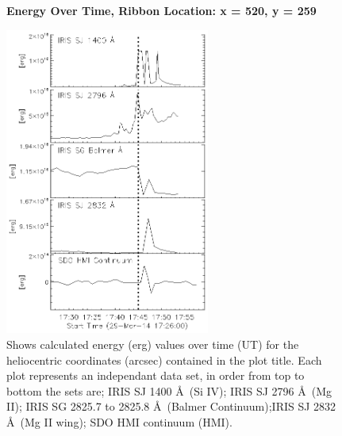 \begin{figure}[H]
  \begin{center}
  \textbf{Energy Over Time, Ribbon Location: x = 520, y = 259 }\par\medskip
  \includegraphics[width=0.6\textwidth]{29-Mar-14-Ribbon-xyPosition-520-259-Frame-2-Energy-Ladder}
  \end{center}
  \caption{Shows calculated energy (erg) values over time (UT) for the heliocentric coordinates (arcsec) contained in the plot title. Each plot represents an independant data set, in order from top to bottom the sets are; IRIS SJ 1400 \AA\ (Si IV); IRIS SJ 2796 \AA\ (Mg II); IRIS SG  2825.7 to 2825.8 \AA\ (Balmer Continuum);IRIS SJ 2832 \AA\ (Mg II wing); SDO HMI continuum (HMI).}\label{erb13}
\end{figure}

